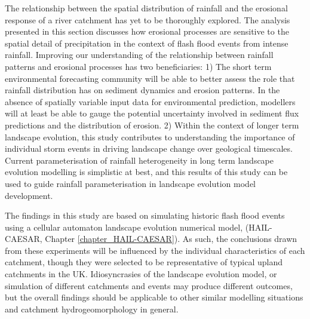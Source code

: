 The relationship between the spatial distribution of rainfall and the erosional response of a river catchment has yet to be thoroughly explored. The analysis presented in this section discusses how erosional processes are sensitive to the spatial detail of precipitation in the context of flash flood events from intense rainfall. Improving our understanding of the relationship between rainfall patterns and erosional processes has two beneficiaries: 1) The short term environmental forecasting community will be able to better assess the role that  rainfall distribution has on sediment dynamics and erosion patterns. In the absence of spatially variable input data for environmental prediction, modellers will at least be able to gauge the potential uncertainty involved in sediment flux predictions and the distribution of erosion. 2) Within the context of longer term landscape evolution, this study contributes to understanding the importance of individual storm events in driving landscape change over geological timescales. Current parameterisation of rainfall heterogeneity in long term landscape evolution modelling is simplistic at best, and this results of this study can be used to guide rainfall parameterisation in landscape evolution model development. 

The findings in this study are based on simulating historic flash flood events using a cellular automaton  landscape evolution numerical model, (HAIL-CAESAR, Chapter \ref{chapter_HAIL-CAESAR}). As such, the conclusions drawn from these experiments will be influenced by the individual characteristics of each catchment, though they were selected to be representative of typical upland catchments in the UK. Idiosyncrasies of the landscape evolution model, or simulation of different catchments and events may produce different outcomes, but the overall findings should be applicable to other similar modelling situations and catchment hydrogeomorphology in general.

